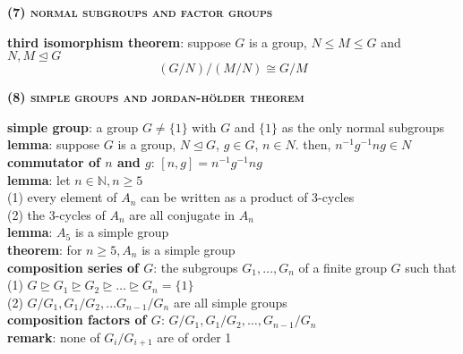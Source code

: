 \documentclass[a4paper]{article}
\begin{document}
\begin{multicols}{2}
\begin{framed}
	\begin{center}
		\textbf{\textsc{(7) normal subgroups and factor groups}}
	\end{center}
	
	\noindent
	\textbf{third isomorphism theorem}: suppose $G$ is a group, $N \leq M \leq G$ and $N, M \unlhd G$
	$$(G / N) / (M / N) \cong G / M$$
\end{framed}

\begin{framed}
	\begin{center}
		\textbf{\textsc{(8) simple groups and jordan-h\"older theorem}}
	\end{center}
	
	\noindent
	\textbf{simple group}: a group $G \neq \{1\}$ with $G$ and $\{1\}$ as the only normal subgroups\\
	
	\noindent
	\textbf{lemma}: suppose $G$ is a group, $N \unlhd G$, $g \in G$, $n \in N$. then, $n^{-1}g^{-1}ng \in N$\\
	
	\noindent
	\textbf{commutator of $n$ and $g$}: $[n, g] = n^{-1}g^{-1}ng$\\
	
	\noindent
	\textbf{lemma}: let $n \in \mathbb{N}, n \geq 5$\\
	(1) every element of $A_n$ can be written as a product of 3-cycles\\
	(2) the 3-cycles of $A_n$ are all conjugate in $A_n$\\
	
	\noindent
	\textbf{lemma}: $A_5$ is a simple group\\
	
	\noindent
	\textbf{theorem}: for $n \geq 5, A_n$ is a simple group\\
	
	\noindent
	\textbf{composition series of $G$}: the subgroups $G_1, \dots, G_n$ of a finite group $G$ such that\\
	(1) $G \unrhd G_1 \unrhd G_2 \unrhd \dots \unrhd G_n = \{1\}$\\
	(2) $G / G_1, G_1 / G_2, \dots G_{n-1} / G_n$ are all simple groups\\
	
	\noindent
	\textbf{composition factors of $G$}: $G / G_1, G_1 / G_2, \dots, G_{n-1} / G_n$\\
	
	\noindent
	\textbf{remark}: none of $G_i / G_{i + 1}$ are of order 1\\
	

\end{framed}
\end{multicols}
\end{document}
